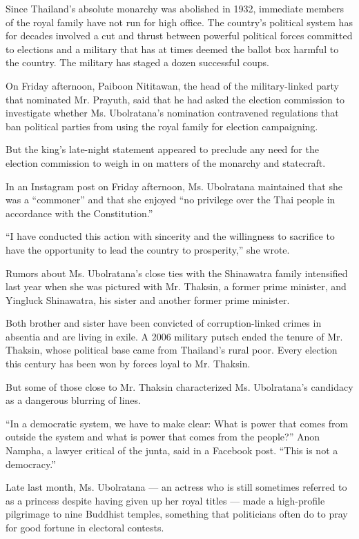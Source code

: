Since Thailand's absolute monarchy was abolished in 1932, immediate
members of the royal family have not run for high office. The country's
political system has for decades involved a cut and thrust between
powerful political forces committed to elections and a military that has
at times deemed the ballot box harmful to the country. The military has
staged a dozen successful coups.

On Friday afternoon, Paiboon Nititawan, the head of the military-linked
party that nominated Mr. Prayuth, said that he had asked the election
commission to investigate whether Ms. Ubolratana's nomination
contravened regulations that ban political parties from using the royal
family for election campaigning.

But the king's late-night statement appeared to preclude any need for
the election commission to weigh in on matters of the monarchy and
statecraft.

In an Instagram post on Friday afternoon, Ms. Ubolratana maintained that
she was a ``commoner'' and that she enjoyed ``no privilege over the Thai
people in accordance with the Constitution.''

``I have conducted this action with sincerity and the willingness to
sacrifice to have the opportunity to lead the country to prosperity,''
she wrote.

Rumors about Ms. Ubolratana's close ties with the Shinawatra family
intensified last year when she was pictured with Mr. Thaksin, a former
prime minister, and Yingluck Shinawatra, his sister and another former
prime minister.

Both brother and sister have been convicted of corruption-linked crimes
in absentia and are living in exile. A 2006 military putsch ended the
tenure of Mr. Thaksin, whose political base came from Thailand's rural
poor. Every election this century has been won by forces loyal to Mr.
Thaksin.

But some of those close to Mr. Thaksin characterized Ms. Ubolratana's
candidacy as a dangerous blurring of lines.

``In a democratic system, we have to make clear: What is power that
comes from outside the system and what is power that comes from the
people?'' Anon Nampha, a lawyer critical of the junta, said in a
Facebook post. ``This is not a democracy.''

Late last month, Ms. Ubolratana --- an actress who is still sometimes
referred to as a princess despite having given up her royal titles ---
made a high-profile pilgrimage to nine Buddhist temples, something that
politicians often do to pray for good fortune in electoral contests.


